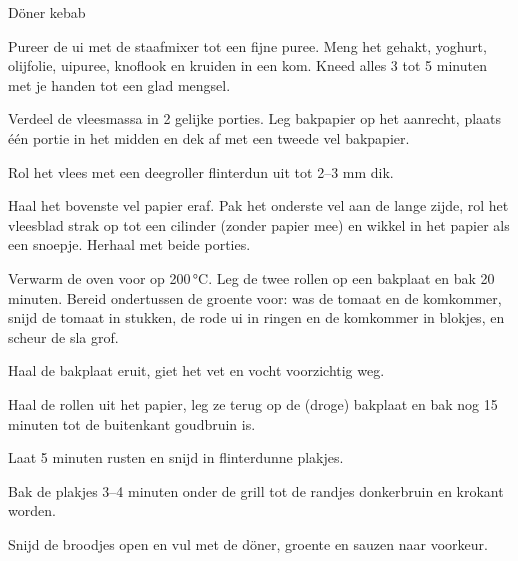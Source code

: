 \begin{recipe}{Döner kebab}
\begin{steps}
  \item Pureer de ui met de staafmixer tot een fijne puree. Meng het gehakt, yoghurt, olijfolie, uipuree, knoflook en kruiden in een kom. Kneed alles 3 tot 5 minuten met je handen tot een glad mengsel.
  \item Verdeel de vleesmassa in 2 gelijke porties. Leg bakpapier op het aanrecht, plaats één portie in het midden en dek af met een tweede vel bakpapier.
  \item Rol het vlees met een deegroller flinterdun uit tot 2--3 mm dik.
  \item Haal het bovenste vel papier eraf. Pak het onderste vel aan de lange zijde, rol het vleesblad strak op tot een cilinder (zonder papier mee) en wikkel in het papier als een snoepje. Herhaal met beide porties.
  \item Verwarm de oven voor op 200\,°C. Leg de twee rollen op een bakplaat en bak 20 minuten. Bereid ondertussen de groente voor: was de tomaat en de komkommer, snijd de tomaat in stukken, de rode ui in ringen en de komkommer in blokjes, en scheur de sla grof.
  \item Haal de bakplaat eruit, giet het vet en vocht voorzichtig weg.
  \item Haal de rollen uit het papier, leg ze terug op de (droge) bakplaat en bak nog 15 minuten tot de buitenkant goudbruin is.
  \item Laat 5 minuten rusten en snijd in flinterdunne plakjes.
  \item Bak de plakjes 3--4 minuten onder de grill tot de randjes donkerbruin en krokant worden.
  \item Snijd de broodjes open en vul met de döner, groente en sauzen naar voorkeur.
\end{steps}

\end{recipe}
